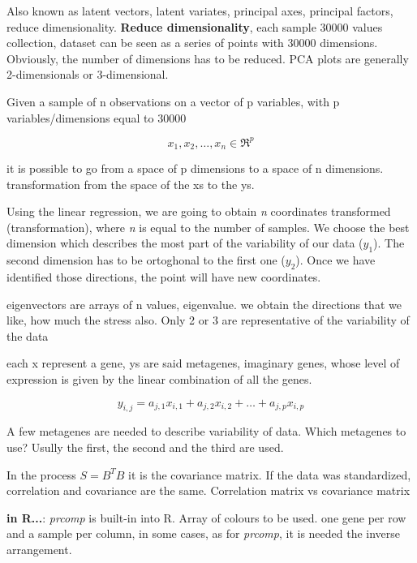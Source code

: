 Also known as latent vectors, latent variates, principal axes, 
principal factors, reduce dimensionality. \textbf{Reduce dimensionality}, each sample 30000 values collection, dataset can be seen as a series of points with 30000 dimensions. Obviously, the number of dimensions has to be reduced. PCA plots are generally 2-dimensionals or 3-dimensional.

Given a sample of
n observations on a vector of p variables, with p variables/dimensions equal to 30000

\begin{equation}
{x_1, x_2, \dots, x_n} \in  \Re^p
\end{equation}

it is possible to go from a space of p dimensions to a space of n dimensions. transformation from the space of the xs to the ys. 

Using the linear regression, we are going to obtain \textit{n} coordinates transformed (transformation), where \textit{n} is equal to the number of samples. We choose the best dimension which describes the most part of the variability of our data ($ y_1 $). The second dimension has to be ortoghonal to the first one ($ y_2 $). Once we have identified those directions, the point will have new coordinates. 

eigenvectors are arrays of n values, eigenvalue.
we obtain the directions that we like, how much the stress also. Only 2 or 3 are representative of the variability of the data 

each x represent a gene, ys are said metagenes, imaginary genes, whose level of expression is given by the linear combination of all the genes. 

\begin{equation}
y_{i,j} = a_{j,1}x_{i,1} + a_{j,2}x_{i,2} + \dots + a_{j,p}x_{i,p}
\end{equation}

A few metagenes are needed to describe variability of data. Which metagenes to use? Usully the first, the second and the third are used. 

In the process $ S = B^T B $ it is the covariance matrix. If the data was standardized, correlation and covariance are the same. Correlation matrix vs covariance matrix %

\textbf{in R...}: \textit{prcomp} is built-in into R. Array of colours to be used. one gene per row and a sample per column, in some cases, as for \textit{prcomp}, it is needed the inverse arrangement. 

